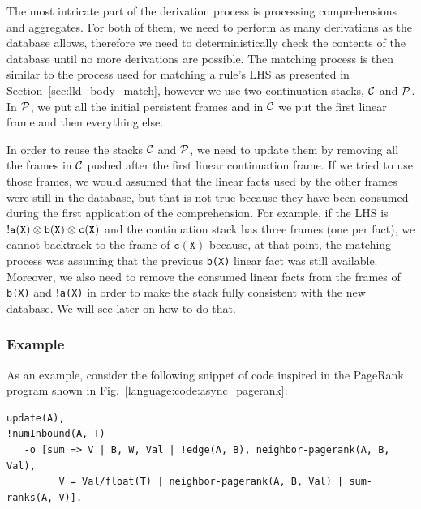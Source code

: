 The most intricate part of the derivation process is processing comprehensions
and aggregates. For both of them, we need to perform as many derivations as the
database allows, therefore we need to deterministically check the contents of
the database until no more derivations are possible.  The matching process is
then similar to the process used for matching a rule's LHS as presented in
Section~\ref{sec:lld_body_match}, however we use two continuation stacks,
$\mathcal{C}$ and $\mathcal{P}$. In $\mathcal{P}$, we put all the initial
persistent frames and in $\mathcal{C}$ we put the first linear frame and then
everything else.

In order to reuse the stacks $\mathcal{C}$ and $\mathcal{P}$, we need to update
them by removing all the frames in $\mathcal{C}$ pushed after the first linear
continuation frame.  If we tried to use those frames, we would assumed that the
linear facts used by the other frames were still in the database, but that is
not true because they have been consumed during the first application of the
comprehension.  For example, if the LHS is ${!} \mathtt{a(X)} \otimes
\mathtt{b(X)} \otimes \mathtt{c(X)}$ and the continuation stack has three frames
(one per fact), we cannot backtrack to the frame of $\mathtt{c(X)}$ because, at
that point, the matching process was assuming that the previous \texttt{b(X)}
linear fact was still available.  Moreover, we also need to remove the consumed
linear facts from the frames of \texttt{b(X)} and ${!}$\texttt{a(X)} in order
to make the stack fully consistent with the new database. We will see later on
how to do that.

\subsubsection{Example}

As an example, consider the following snippet of code inspired in the PageRank
program shown in Fig.~\ref{language:code:async_pagerank}:

\begin{Verbatim}[fontsize=\codesize]
update(A),
!numInbound(A, T)
   -o [sum => V | B, W, Val | !edge(A, B), neighbor-pagerank(A, B, Val),
         V = Val/float(T) | neighbor-pagerank(A, B, Val) | sum-ranks(A, V)].
\end{Verbatim}

